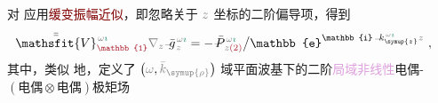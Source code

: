 对  应用\textcolor{Maroon}{缓变振幅近似}，即忽略关于 $\mathcolor{gray}{z}$ 坐标的二阶偏导项，得到
\begin{align} \label{eq:nonlinear(2)-wave_wkrho-simplify6-V2'-SVA}
	\Xint{\mathcolor{gray}{-}}{25}{\bar{\bar{\mathsfit{V}}}}^{\;\! \mathcolor{gray}{\omega} \textcolor{PineGreen}{\imath}}_{\textcolor{Maroon}{\mathbb{1}}} \mathcolor{gray}{\nabla_z} \Xint{{}^{}_{\mathcolor{gray}{-}}}{10}{\bar{g}}^{\;\!\mathcolor{gray}{\omega} \textcolor{PineGreen}{\imath}}_{\;\! \mathcolor{gray}{z}} = - \Xint{\mathcolor{gray}{-}}{30}{\bar{P}}^{\;\! \mathcolor{gray}{\omega} \textcolor{PineGreen}{\imath}}_{\;\! \mathcolor{gray}{z} \textcolor{Maroon}{(2)}} \big/ \mathbb{e}^{\mathbb{i} \Xint{\begin{smallmatrix} ~ \\ {}^{}_{\mathcolor{gray}{-}} \\ ~ \end{smallmatrix}}{15}{k}_{\symup{z}}^{\;\! \mathcolor{gray}{\omega} \textcolor{PineGreen}{\imath}} \mathcolor{gray}{z}} ~,
\end{align}
其中，类似  地，定义了 $\left( \mathcolor{gray}{\omega}, \mathcolor{gray}{\bar{k}_{\symup{\rho}}} \right)$ 域\textcolor{PineGreen}{平面波基}下的二阶\textcolor{Plum}{局域}\textcolor{Plum}{非线性}\textcolor{NavyBlue}{电偶-$(\text{电偶}\otimes\text{电偶})$}极矩场
